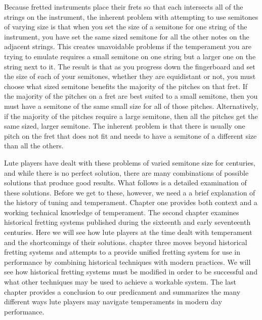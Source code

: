 Because fretted instruments place their frets so that each intersects all of the
strings on the instrument, the inherent problem with attempting to use semitones of
varying size is that when you set the size of a semitone for one string of the
instrument, you have set the same sized semitone for all the other notes on the
adjacent strings. This creates unavoidable problems if the temperament you are trying
to emulate requires a small semitone on one string but a larger one
on the string next to it. The result is that as you progress down the fingerboard and
set the size of each of your semitones, whether they are equidistant or not, you must
choose what sized semitone benefits the majority of the pitches on that fret. If the
majority of the pitches on a fret are best suited to a small semitone, then you must
have a semitone of the same small size for all of those pitches. Alternatively, if the
majority of the pitches require a large semitone, then all the pitches get the same
sized, larger semitone.  The inherent problem is that there is usually one pitch on the
fret that does not fit and needs to have a semitone of a different size than
all the others.

Lute players have dealt with these problems of varied semitone size for centuries, and
while there is no perfect solution, there are many combinations of
possible solutions that produce good results. What follows is a detailed examination
of these solutions.  Before we get to these, however, we need a a brief
explanation of the history of tuning and temperament. Chapter one provides both
context and a working technical knowledge of temperament. The second chapter
examines historical fretting systems published during the sixteenth and early
seventeenth centuries. Here we will see how lute players at the time dealt with
temperament and the shortcomings of their solutions. chapter three moves beyond
historical fretting systems and attempts to a provide unified fretting system for use
in performance by combining historical techniques with modern practices.  We will see
how historical fretting systems must be modified in order to be successful and what
other techniques may be used to achieve a workable system. The last chapter provides a
conclusion to our predicament and summarizes the many different ways lute players
may navigate temperaments in modern day performance.

